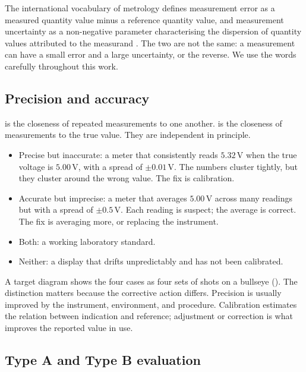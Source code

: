 The international vocabulary of metrology defines measurement error as
a measured quantity value minus a reference quantity value, and
measurement uncertainty as a non-negative parameter characterising the
dispersion of quantity values attributed to the measurand
\cite{std:jcgm-vim}. The two are not the same: a measurement can have
a small error and a large uncertainty, or the reverse. We use the
words carefully throughout this work.

\subsection{Precision and accuracy}

 is the closeness of repeated measurements to one
another.  is the closeness of measurements to the
true value. They are independent in principle.

\begin{itemize}[leftmargin=*]
  \item Precise but inaccurate: a meter that consistently reads
    $5.32 \,\si{\volt}$ when the true voltage is $5.00 \,\si{\volt}$,
    with a spread of $\pm 0.01 \,\si{\volt}$. The numbers cluster
    tightly, but they cluster around the wrong value. The fix is
    calibration.
  \item Accurate but imprecise: a meter that averages
    $5.00 \,\si{\volt}$ across many readings but with a spread of
    $\pm 0.5 \,\si{\volt}$. Each reading is suspect; the average is
    correct. The fix is averaging more, or replacing the
    instrument.
  \item Both: a working laboratory standard.
  \item Neither: a display that drifts unpredictably and has not been
    calibrated.
\end{itemize}

A target diagram shows the four cases as four sets of shots on a
bullseye (). The distinction matters
because the corrective action differs. Precision is usually
improved by the instrument, environment, and procedure. Calibration
estimates the relation between indication and reference; adjustment
or correction is what improves the reported value in use.



\subsection{Type A and Type B evaluation}

